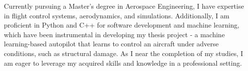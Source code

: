 \begin{cvparagraph}
Currently pursuing a Master's degree in Aerospace Engineering, I have expertise in flight control systems, aerodynamics, and simulations. Additionally, I am proficient in Python and C++ for software development and machine learning, which have been instrumental in developing my thesis project - a machine learning-based autopilot that learns to control an aircraft under adverse conditions, such as structural damage. As I near the completion of my studies, I am eager to leverage my acquired skills and knowledge in a professional setting.
\end{cvparagraph}
